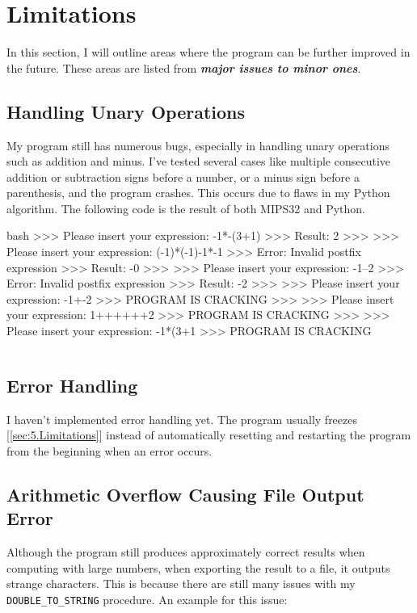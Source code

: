 \section{Limitations}
    In this section, I will outline areas where the program can be further improved in the future. These areas are listed from \textbf{\textit{major issues to minor ones}}.
    
    \subsection{Handling Unary Operations}
        My program still has numerous bugs, especially in handling unary operations such as addition and minus. I've tested several cases like multiple consecutive addition or subtraction signs before a number, or a minus sign before a parenthesis, and the program crashes. This occurs due to flaws in my Python algorithm. The following code is the result of both MIPS32 and Python.

        \label{sec:5.Limitations}
        \begin{code}{bash}
            >>> Please insert your expression: -1*-(3+1)
            >>> Result: 2
            >>>
            >>> Please insert your expression: (-1)*(-1)-1*-1
            >>> Error: Invalid postfix expression
            >>> Result: -0
            >>> 
            >>> Please insert your expression: -1--2
            >>> Error: Invalid postfix expression
            >>> Result: -2
            >>> 
            >>> Please insert your expression: -1+-2
            >>> PROGRAM IS CRACKING
            >>> 
            >>> Please insert your expression: 1++++++2
            >>> PROGRAM IS CRACKING
            >>> 
            >>> Please insert your expression: -1*(3+1
            >>> PROGRAM IS CRACKING
        \end{code}
        \begin{lstlisting}[language=bash, caption={Failing testcase}]
        \end{lstlisting}
    
    \subsection{Error Handling}
        I haven't implemented error handling yet. The program usually freezes [\ref{sec:5.Limitations}] instead of automatically resetting and restarting the program from the beginning when an error occurs.
    
    \subsection{Arithmetic Overflow Causing File Output Error}
        Although the program still produces approximately correct results when computing with large numbers, when exporting the result to a file, it outputs strange characters. This is because there are still many issues with my \texttt{DOUBLE\_TO\_STRING} procedure. An example for this issue:

